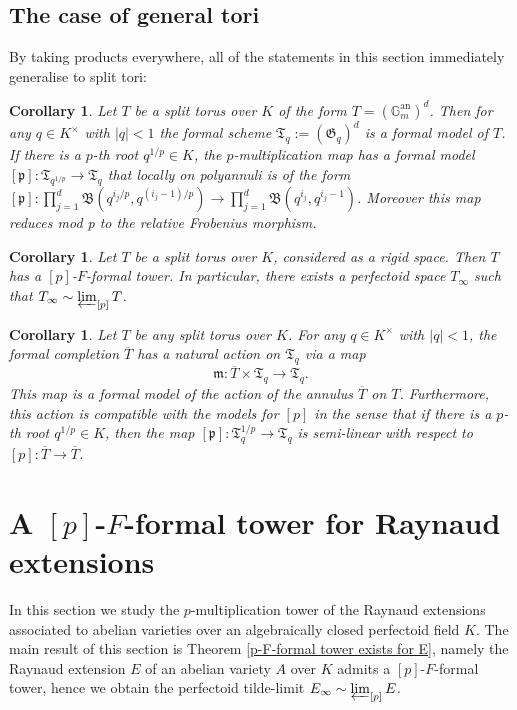 \documentclass[10pt,oneside]{amsart}
\newtheorem{corollary}[theorem]{Corollary}
\theoremstyle{definition}
\begin{document}
	\subsection{The case of general tori}
	By taking products everywhere, all of the statements in this section immediately generalise to split tori:
	\begin{corollary}\label{torus has formal models}
		Let $T$ be a split torus over $K$ of the form $T=(\mathbb G_m^{\operatorname{an}})^d$. Then for any $q\in K^\times$ with $|q|<1$ the formal scheme $\mathfrak T_q := (\mathfrak G_q)^d$ is a formal model of $T$. If there is a $p$-th root $q^{1/p}\in K$, the $p$-multiplication map has a formal model $[\mathfrak p]:\mathfrak T_{q^{1/p}}\rightarrow \mathfrak T_{q}$ that locally on polyannuli is of the form $[\mathfrak p]:\prod_{j=1}^d \mathfrak B(q^{i_j/p},q^{(i_j-1)/p})\rightarrow \prod_{j=1}^d \mathfrak B(q^{i_j},q^{i_j-1})$. Moreover this map reduces mod p to the relative Frobenius morphism.
	\end{corollary}
	\begin{corollary}\label{torus has p-F-formal tower and has perfectoid tilde-limit}
		Let $T$ be a split torus over $K$, considered as a rigid space. Then $T$ has a $[p]$-$F$-formal tower. In particular, there exists a perfectoid space $T_\infty$ such that $T_\infty \sim \varprojlim_{[p]} T$. 
	\end{corollary}
	
	\begin{corollary}\label{action on formal model of torus}
		Let $T$ be any split torus over $K$. For any $q\in K^\times$ with $|q|<1$, the formal completion $\overline{T}$ has a natural action on $\mathfrak T_q$ via a map
		\[\mathfrak m:\overline{T}\times \mathfrak T_q\rightarrow \mathfrak T_q.\]
		This map is a formal model of the action of the annulus $\overline{T}$ on $T$. Furthermore, this action is compatible with the models for $[p]$ in the sense that if there is a $p$-th root $q^{1/p}\in K$, then the map $[\mathfrak p]:\mathfrak T_q^{1/p}\rightarrow \mathfrak T_q$ is semi-linear with respect to $[p]:\overline{T}\rightarrow \overline{T}$.
	\end{corollary}  
	
	

	\section{A $[p]$-$F$-formal tower for Raynaud extensions}\label{Raynaud extensions as principal bundles of formal and rigid spaces}
	In this section we study the $p$-multiplication tower of the Raynaud extensions associated to abelian varieties over an algebraically closed perfectoid field $K$. The main result of this section is Theorem \ref{p-F-formal tower exists for E}, namely the Raynaud extension $E$ of an abelian variety $A$ over $K$ admits a $[p]$-$F$-formal tower, hence we obtain the perfectoid tilde-limit $E_\infty \sim \varprojlim_{[p]} E$.  
	
\end{document}

